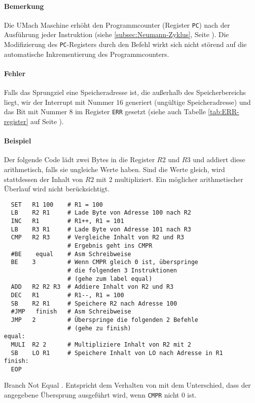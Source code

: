 \paragraph{Bemerkung}
Die UMach Maschine erhöht den Programmcounter (Register \texttt{PC}) nach
der Ausführung jeder Instruktion
(siehe \ref{subsec:Neumann-Zyklus}, Seite
\pageref{subsec:Neumann-Zyklus}).
Die Modifizierung des \texttt{PC}-Registers durch den  Befehl wirkt
sich nicht störend auf die automatische Inkrementierung des Programmcounters.

\paragraph{Fehler}
Falls das Sprungziel eine Speicheradresse ist, die außerhalb des
Speicherbereichs liegt, wir der Interrupt mit Nummer 16 generiert (ungültige
Speicheradresse) und das Bit mit Nummer 8 im Register \texttt{ERR} gesetzt
(siehe auch Tabelle \ref{tab:ERR-register} auf Seite
\pageref{tab:ERR-register}).


\paragraph{Beispiel}
Der folgende Code lädt zwei Bytes in die Register $R2$ und $R3$ und addiert
diese arithmetisch, falls sie ungleiche Werte haben. Sind die Werte gleich,
wird stattdessen der Inhalt von $R2$ mit 2 multipliziert. Ein möglicher
arithmetischer Überlauf wird nicht berücksichtigt.
\begin{lstlisting}
  SET   R1 100    # R1 = 100
  LB    R2 R1     # Lade Byte von Adresse 100 nach R2
  INC   R1        # R1++, R1 = 101
  LB    R3 R1     # Lade Byte von Adresse 101 nach R3
  CMP   R2 R3     # Vergleiche Inhalt von R2 und R3
                  # Ergebnis geht ins CMPR
  #BE    equal    # Asm Schreibweise
  BE    3         # Wenn CMPR gleich 0 ist, überspringe 
                  # die folgenden 3 Instruktionen
                  # (gehe zum label equal)
  ADD   R2 R2 R3  # Addiere Inhalt von R2 und R3
  DEC   R1        # R1--, R1 = 100
  SB    R2 R1     # Speichere R2 nach Adresse 100
  #JMP   finish   # Asm Schreibweise
  JMP   2         # Überspringe die folgenden 2 Befehle
                  # (gehe zu finish)
equal:
  MULI  R2 2      # Multipliziere Inhalt von R2 mit 2
  SB    LO R1     # Speichere Inhalt von LO nach Adresse in R1
finish:
  EOP
\end{lstlisting}



\glqq Branch Not Equal \grqq.
Entspricht dem Verhalten von  mit dem Unterschied, dass der angegebene
Übersprung ausgeführt wird, wenn \texttt{CMPR} nicht $0$ ist.


